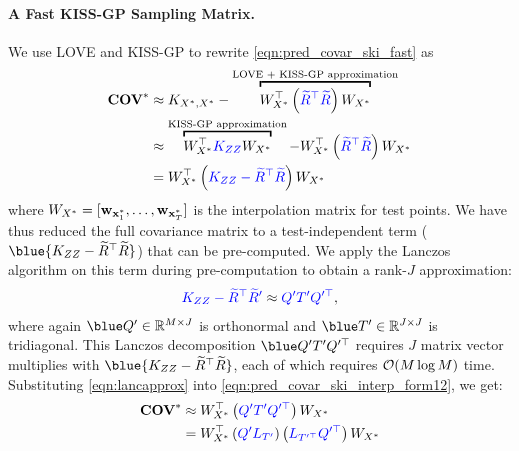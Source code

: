 \paragraph{A Fast KISS-GP Sampling Matrix.}
We use LOVE{} and KISS-GP to rewrite \cref{eqn:pred_covar_ski_fast} as
%
\begin{align}
  \Covtest
  &\approx
  \bK_{\bXtest, \bXtest} - \overbracket{
    \bW^\top_{\bXtest} \left( {\color{blue} \widetilde \bR^\top \widetilde \bR} \right) \bW_{\bXtest}
  }^\text{LOVE + KISS-GP approximation}
  \nonumber
  \\
  &\approx \overbracket{
    \bW^\top_{\bXtest} {\color{blue} \bK_{\bZ\bZ} } \bW_{\bXtest}
  }^\text{KISS-GP approximation}
   - \bW^\top_{\bXtest} \left( {\color{blue} \widetilde \bR^\top \widetilde \bR} \right) \bW_{\bXtest}
  \nonumber
  \\
  &= \bW^\top_{\bXtest} \left( {\color{blue} \bK_{\bZ\bZ} - \widetilde \bR^\top \widetilde \bR } \right) \bW_{\bXtest}
  \label{eqn:pred_covar_ski_interp_form12}
\end{align}
%
where $W_{X^*} = [\mathbf{w}_{\mathbf{x}^*_1}, \ldots, \mathbf{w}_{\mathbf{x}^*_T}]$ is the interpolation matrix for test points.
We have thus reduced the full covariance matrix to a test-independent term ($\blue{ \bK_{\bZ\bZ} - \widetilde \bR^\top \widetilde \bR }$) that can be pre-computed.
We apply the Lanczos algorithm on this term during pre-computation to obtain a rank-$J$ approximation:
%
\begin{align}
  { \color{blue} \ensuremath{K}_{\ensuremath{Z}\ensuremath{Z}} -  \widetilde {\ensuremath{R}}^\top \widetilde {\ensuremath{R}}' }
  \approx
  { \color{blue} \ensuremath{Q}' \ensuremath{T}' \ensuremath{Q}^{\prime\top} },
  \label{eqn:lancapprox}
\end{align}
%
where again ${\blue \bQ'} \in \reals^{M \times J}$ is orthonormal and ${\blue \bT'} \in \reals^{J \times J}$ is tridiagonal.
This Lanczos decomposition $\blue \bQ' \bT' \bQ^{\prime\top}$ requires $J$ matrix vector multiplies with $\blue{ \bK_{\bZ\bZ} - \widetilde \bR^{\top} \widetilde \bR }$, each of which requires $\bigo{M \log M}$ time.
Substituting \cref{eqn:lancapprox} into \cref{eqn:pred_covar_ski_interp_form12}, we get:
%
\begin{align}
  \textbf{COV}^*
  &\approx W^\top_{X^*} \left( {\color{blue} Q' T' Q^{\prime\top} } \right) W_{X^*}
  \nonumber
  \\
  &= W^\top_{X^*} \left( {\color{blue} Q' L_{T'} } \right)
  \left( {\color{blue} L_{T^{\prime\top}} Q^{\prime\top} } \right) W_{X^*}
  \label{eqn:sampling_pre_cholesky}
\end{align}

